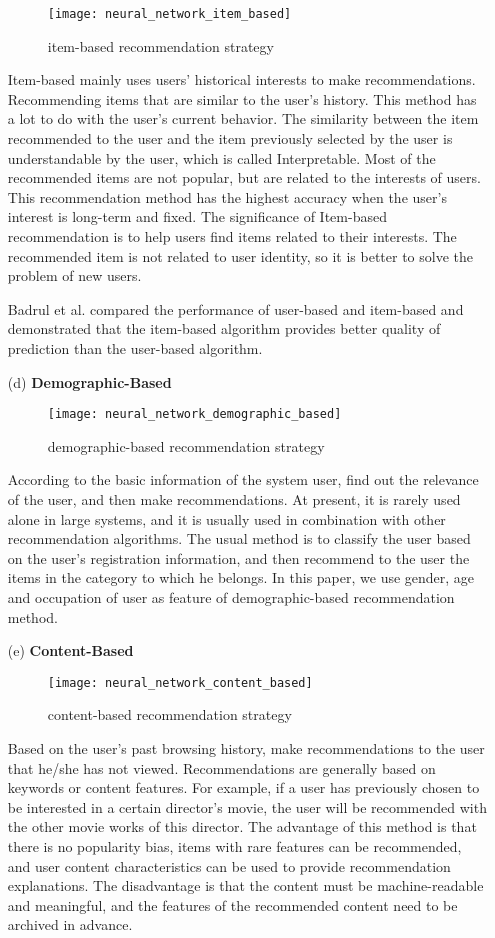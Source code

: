 \begin{itemize}
\begin{figure}[h]
\caption{item-based recommendation strategy}
\centering
\texttt{[image: neural\_network\_item\_based]}
\end{figure}
Item-based mainly uses users' historical interests to make recommendations. Recommending items that are similar to the user's history. This method has a lot to do with the user's current behavior. The similarity between the item recommended to the user and the item previously selected by the user is understandable by the user, which is called Interpretable. Most of the recommended items are not popular, but are related to the interests of users. This recommendation method has the highest accuracy when the user's interest is long-term and fixed. The significance of Item-based recommendation is to help users find items related to their interests. The recommended item is not related to user identity, so it is better to solve the problem of new users.
\par Badrul et al.\cite{sarwar2001item} compared the performance of user-based and item-based and demonstrated that the item-based algorithm provides better quality of prediction than the user-based algorithm.
\item[(d)]\textbf{Demographic-Based}\\
\begin{figure}[h]
\caption{demographic-based recommendation strategy}
\centering
\texttt{[image: neural\_network\_demographic\_based]}
\end{figure}
According to the basic information of the system user, find out the relevance of the user, and then make recommendations. At present, it is rarely used alone in large systems, and it is usually used in combination with other recommendation algorithms. The usual method is to classify the user based on the user's registration information, and then recommend to the user the items in the category to which he belongs. In this paper, we use gender, age and occupation of user as feature of demographic-based recommendation method.
\item[(e)]\textbf{Content-Based}\\
\begin{figure}[h]
\caption{content-based recommendation strategy}
\centering
\texttt{[image: neural\_network\_content\_based]}
\end{figure}
Based on the user's past browsing history, make recommendations to the user that he/she has not viewed. Recommendations are generally based on keywords or content features. For example, if a user has previously chosen to be interested in a certain director's movie, the user will be recommended with the other movie works of this director. The advantage of this method is that there is no popularity bias, items with rare features can be recommended, and user content characteristics can be used to provide recommendation explanations. The disadvantage is that the content must be machine-readable and meaningful, and the features of the recommended content need to be archived in advance.

\end{itemize}
